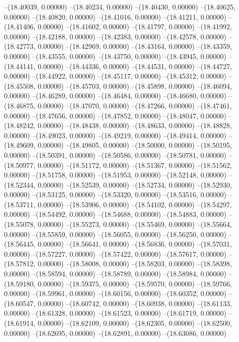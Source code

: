 --(18.40039, 0.00000)
--(18.40234, 0.00000)
--(18.40430, 0.00000)
--(18.40625, 0.00000)
--(18.40820, 0.00000)
--(18.41016, 0.00000)
--(18.41211, 0.00000)
--(18.41406, 0.00000)
--(18.41602, 0.00000)
--(18.41797, 0.00000)
--(18.41992, 0.00000)
--(18.42188, 0.00000)
--(18.42383, 0.00000)
--(18.42578, 0.00000)
--(18.42773, 0.00000)
--(18.42969, 0.00000)
--(18.43164, 0.00000)
--(18.43359, 0.00000)
--(18.43555, 0.00000)
--(18.43750, 0.00000)
--(18.43945, 0.00000)
--(18.44141, 0.00000)
--(18.44336, 0.00000)
--(18.44531, 0.00000)
--(18.44727, 0.00000)
--(18.44922, 0.00000)
--(18.45117, 0.00000)
--(18.45312, 0.00000)
--(18.45508, 0.00000)
--(18.45703, 0.00000)
--(18.45898, 0.00000)
--(18.46094, 0.00000)
--(18.46289, 0.00000)
--(18.46484, 0.00000)
--(18.46680, 0.00000)
--(18.46875, 0.00000)
--(18.47070, 0.00000)
--(18.47266, 0.00000)
--(18.47461, 0.00000)
--(18.47656, 0.00000)
--(18.47852, 0.00000)
--(18.48047, 0.00000)
--(18.48242, 0.00000)
--(18.48438, 0.00000)
--(18.48633, 0.00000)
--(18.48828, 0.00000)
--(18.49023, 0.00000)
--(18.49219, 0.00000)
--(18.49414, 0.00000)
--(18.49609, 0.00000)
--(18.49805, 0.00000)
--(18.50000, 0.00000)
--(18.50195, 0.00000)
--(18.50391, 0.00000)
--(18.50586, 0.00000)
--(18.50781, 0.00000)
--(18.50977, 0.00000)
--(18.51172, 0.00000)
--(18.51367, 0.00000)
--(18.51562, 0.00000)
--(18.51758, 0.00000)
--(18.51953, 0.00000)
--(18.52148, 0.00000)
--(18.52344, 0.00000)
--(18.52539, 0.00000)
--(18.52734, 0.00000)
--(18.52930, 0.00000)
--(18.53125, 0.00000)
--(18.53320, 0.00000)
--(18.53516, 0.00000)
--(18.53711, 0.00000)
--(18.53906, 0.00000)
--(18.54102, 0.00000)
--(18.54297, 0.00000)
--(18.54492, 0.00000)
--(18.54688, 0.00000)
--(18.54883, 0.00000)
--(18.55078, 0.00000)
--(18.55273, 0.00000)
--(18.55469, 0.00000)
--(18.55664, 0.00000)
--(18.55859, 0.00000)
--(18.56055, 0.00000)
--(18.56250, 0.00000)
--(18.56445, 0.00000)
--(18.56641, 0.00000)
--(18.56836, 0.00000)
--(18.57031, 0.00000)
--(18.57227, 0.00000)
--(18.57422, 0.00000)
--(18.57617, 0.00000)
--(18.57812, 0.00000)
--(18.58008, 0.00000)
--(18.58203, 0.00000)
--(18.58398, 0.00000)
--(18.58594, 0.00000)
--(18.58789, 0.00000)
--(18.58984, 0.00000)
--(18.59180, 0.00000)
--(18.59375, 0.00000)
--(18.59570, 0.00000)
--(18.59766, 0.00000)
--(18.59961, 0.00000)
--(18.60156, 0.00000)
--(18.60352, 0.00000)
--(18.60547, 0.00000)
--(18.60742, 0.00000)
--(18.60938, 0.00000)
--(18.61133, 0.00000)
--(18.61328, 0.00000)
--(18.61523, 0.00000)
--(18.61719, 0.00000)
--(18.61914, 0.00000)
--(18.62109, 0.00000)
--(18.62305, 0.00000)
--(18.62500, 0.00000)
--(18.62695, 0.00000)
--(18.62891, 0.00000)
--(18.63086, 0.00000)
